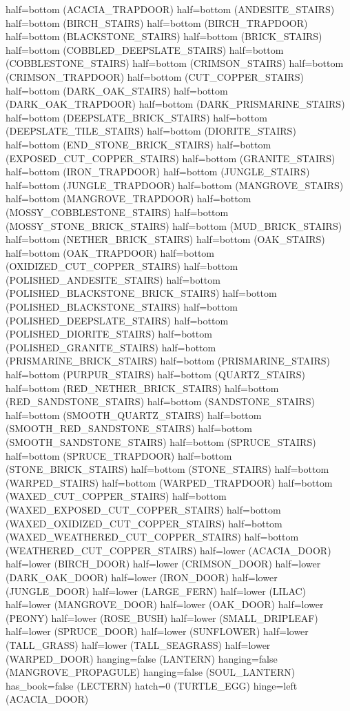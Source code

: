 \documentclass[11pt]{article}
\begin{document}
half=bottom (ACACIA_TRAPDOOR)
half=bottom (ANDESITE_STAIRS)
half=bottom (BIRCH_STAIRS)
half=bottom (BIRCH_TRAPDOOR)
half=bottom (BLACKSTONE_STAIRS)
half=bottom (BRICK_STAIRS)
half=bottom (COBBLED_DEEPSLATE_STAIRS)
half=bottom (COBBLESTONE_STAIRS)
half=bottom (CRIMSON_STAIRS)
half=bottom (CRIMSON_TRAPDOOR)
half=bottom (CUT_COPPER_STAIRS)
half=bottom (DARK_OAK_STAIRS)
half=bottom (DARK_OAK_TRAPDOOR)
half=bottom (DARK_PRISMARINE_STAIRS)
half=bottom (DEEPSLATE_BRICK_STAIRS)
half=bottom (DEEPSLATE_TILE_STAIRS)
half=bottom (DIORITE_STAIRS)
half=bottom (END_STONE_BRICK_STAIRS)
half=bottom (EXPOSED_CUT_COPPER_STAIRS)
half=bottom (GRANITE_STAIRS)
half=bottom (IRON_TRAPDOOR)
half=bottom (JUNGLE_STAIRS)
half=bottom (JUNGLE_TRAPDOOR)
half=bottom (MANGROVE_STAIRS)
half=bottom (MANGROVE_TRAPDOOR)
half=bottom (MOSSY_COBBLESTONE_STAIRS)
half=bottom (MOSSY_STONE_BRICK_STAIRS)
half=bottom (MUD_BRICK_STAIRS)
half=bottom (NETHER_BRICK_STAIRS)
half=bottom (OAK_STAIRS)
half=bottom (OAK_TRAPDOOR)
half=bottom (OXIDIZED_CUT_COPPER_STAIRS)
half=bottom (POLISHED_ANDESITE_STAIRS)
half=bottom (POLISHED_BLACKSTONE_BRICK_STAIRS)
half=bottom (POLISHED_BLACKSTONE_STAIRS)
half=bottom (POLISHED_DEEPSLATE_STAIRS)
half=bottom (POLISHED_DIORITE_STAIRS)
half=bottom (POLISHED_GRANITE_STAIRS)
half=bottom (PRISMARINE_BRICK_STAIRS)
half=bottom (PRISMARINE_STAIRS)
half=bottom (PURPUR_STAIRS)
half=bottom (QUARTZ_STAIRS)
half=bottom (RED_NETHER_BRICK_STAIRS)
half=bottom (RED_SANDSTONE_STAIRS)
half=bottom (SANDSTONE_STAIRS)
half=bottom (SMOOTH_QUARTZ_STAIRS)
half=bottom (SMOOTH_RED_SANDSTONE_STAIRS)
half=bottom (SMOOTH_SANDSTONE_STAIRS)
half=bottom (SPRUCE_STAIRS)
half=bottom (SPRUCE_TRAPDOOR)
half=bottom (STONE_BRICK_STAIRS)
half=bottom (STONE_STAIRS)
half=bottom (WARPED_STAIRS)
half=bottom (WARPED_TRAPDOOR)
half=bottom (WAXED_CUT_COPPER_STAIRS)
half=bottom (WAXED_EXPOSED_CUT_COPPER_STAIRS)
half=bottom (WAXED_OXIDIZED_CUT_COPPER_STAIRS)
half=bottom (WAXED_WEATHERED_CUT_COPPER_STAIRS)
half=bottom (WEATHERED_CUT_COPPER_STAIRS)
half=lower (ACACIA_DOOR)
half=lower (BIRCH_DOOR)
half=lower (CRIMSON_DOOR)
half=lower (DARK_OAK_DOOR)
half=lower (IRON_DOOR)
half=lower (JUNGLE_DOOR)
half=lower (LARGE_FERN)
half=lower (LILAC)
half=lower (MANGROVE_DOOR)
half=lower (OAK_DOOR)
half=lower (PEONY)
half=lower (ROSE_BUSH)
half=lower (SMALL_DRIPLEAF)
half=lower (SPRUCE_DOOR)
half=lower (SUNFLOWER)
half=lower (TALL_GRASS)
half=lower (TALL_SEAGRASS)
half=lower (WARPED_DOOR)
hanging=false (LANTERN)
hanging=false (MANGROVE_PROPAGULE)
hanging=false (SOUL_LANTERN)
has_book=false (LECTERN)
hatch=0 (TURTLE_EGG)
hinge=left (ACACIA_DOOR)
\end{document}
